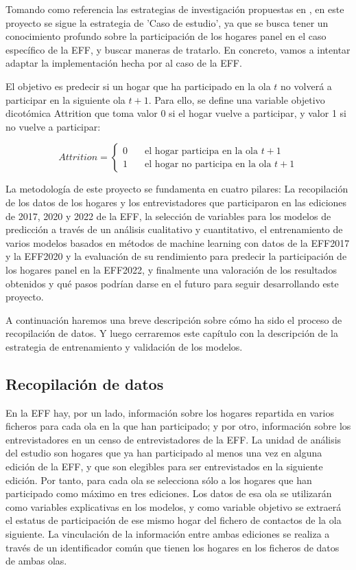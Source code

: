 Tomando como referencia las estrategias de investigación propuestas en \cite{oates2022researching}, en este proyecto se sigue la estrategia de 'Caso de estudio', ya que se busca tener un conocimiento profundo sobre la participación de los hogares panel en el caso específico de la EFF, y buscar maneras de tratarlo. En concreto, vamos a intentar adaptar la implementación hecha por \cite{beste2023case} al caso de la EFF.

El objetivo es predecir si un hogar que ha participado en la ola $t$ no volverá a participar en la siguiente ola $t+1$. Para ello, se define una variable objetivo dicotómica Attrition que toma valor 0 si el hogar vuelve a participar, y valor 1 si no vuelve a participar:

\begin{equation}
Attrition =
  \begin{cases}
    0       & \quad \text{el hogar participa en la ola $t+1$} \\
    1  & \quad \text{el hogar no participa en la ola $t+1$}
  \end{cases}
\end{equation}

La metodología de este proyecto se fundamenta en cuatro pilares: La recopilación de los datos de los hogares y los entrevistadores que participaron en las ediciones de 2017, 2020 y 2022 de la EFF, la selección de variables para los modelos de predicción a través de un análisis cualitativo y cuantitativo, el entrenamiento de varios modelos basados en métodos de machine learning con datos de la EFF2017 y la EFF2020 y la evaluación de su rendimiento para predecir la participación de los hogares panel en la EFF2022, y finalmente una valoración de los resultados obtenidos y qué pasos podrían darse en el futuro para seguir desarrollando este proyecto.

A continuación haremos una breve descripción sobre cómo ha sido el proceso de recopilación de datos. Y luego cerraremos este capítulo con la descripción de la estrategia de entrenamiento y validación de los modelos.

\subsection{Recopilación de datos}

En la EFF hay, por un lado, información sobre los hogares repartida en varios ficheros para cada ola en la que han participado; y por otro, información sobre los entrevistadores en un censo de entrevistadores de la EFF. La unidad de análisis del estudio son hogares que ya han participado al menos una vez en alguna edición de la EFF, y que son elegibles para ser entrevistados en la siguiente edición. Por tanto, para cada ola se selecciona sólo a los hogares que han participado como máximo en tres ediciones. Los datos de esa ola se utilizarán como variables explicativas en los modelos, y como variable objetivo se extraerá el estatus de participación de ese mismo hogar del fichero de contactos de la ola siguiente. La vinculación de la información entre ambas ediciones se realiza a través de un identificador común que tienen los hogares en los ficheros de datos de ambas olas.


